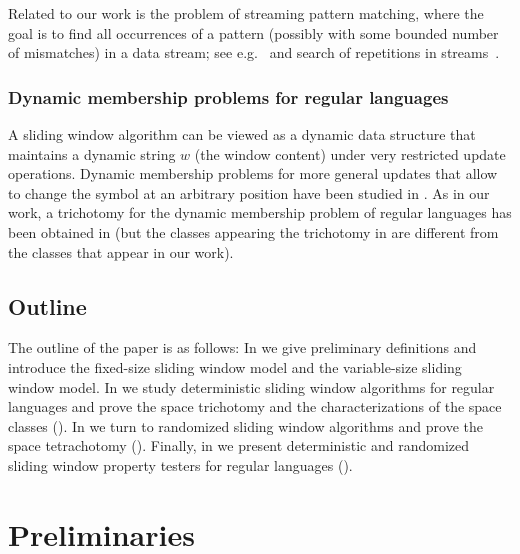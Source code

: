 \documentclass{article}\usepackage[a4paper,margin=20mm]{geometry}
\begin{document}
Related to our work is the problem of streaming pattern matching, where the goal is to find all occurrences of a pattern (possibly
with some bounded number of mismatches) in a data stream; see e.g.~\cite{DBLP:conf/focs/KociumakaPS21,DBLP:journals/iandc/RadoszewskiS20,DBLP:conf/cpm/GolanKKP20,DBLP:journals/algorithmica/GawrychowskiS22,BreslauerG14,CliffordFPSS15,CliffordFPSS16,CliffordKP19,CliffordS16,GolanKP16,GolanP17,GolanKP18,PoratP09,Starikovskaya17} and search of repetitions in streams~\cite{Ergun:10,stream-periodicity-mismatches,stream-periodicity-wildcards,DBLP:conf/cpm/GawrychowskiRS19,DBLP:journals/algorithmica/GawrychowskiMSU19,DBLP:conf/cpm/MerkurevS19,DBLP:conf/spire/MerkurevS19}.

\subsubsection{Dynamic membership problems for regular languages} 

A sliding window algorithm can be viewed as a dynamic data structure that
maintains a dynamic string $w$ (the window content) under very restricted update operations.
Dynamic membership problems for more general
updates that allow to change the symbol at an arbitrary position have been studied 
in \cite{AmarilliJP21,FrandsenHMRS95,FrandsenMS97}. As in our work, a trichotomy
for the dynamic membership problem of regular languages has been obtained in \cite{AmarilliJP21}
(but the classes appearing the trichotomy in \cite{AmarilliJP21} are different from the classes that
appear in our work).



\subsection{Outline}

The outline of the paper is as follows:
In  we give preliminary definitions
and introduce the fixed-size sliding window model
and the variable-size sliding window model.
In  we study deterministic sliding window algorithms
for regular languages and prove the space trichotomy
and the characterizations of the space classes ().
In  we turn to randomized sliding window algorithms and
prove the space tetrachotomy ().
Finally, in  we present deterministic and randomized
sliding window property testers for regular languages ().


\section{Preliminaries}
\end{document}
